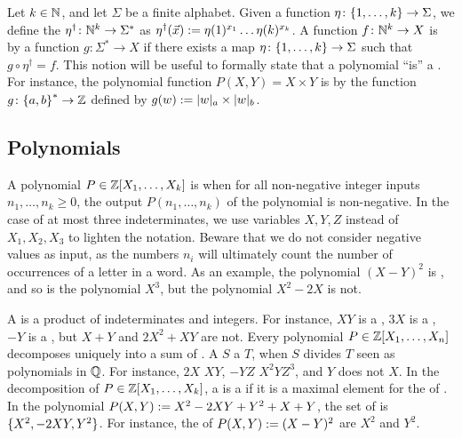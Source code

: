 \AP Let $k \in \mathbb{N}$, and let $\Sigma$ be a finite alphabet. Given a function
$\eta \colon \mathopen{\{} 1, \dots, k \mathclose{\}} \to \Sigma$, we define the $\eta^\dagger \colon
\mathbb{N}^k \to \Sigma^*$ as $\eta^\dagger(\vec{x}) \mathrel{:=} \eta(1)^{x_1} \dots
\eta(k)^{x_k}$. A function $f \colon \mathbb{N}^k \to X$ is  by a
 function $g \colon \Sigma^* \to X$ if there exists a map $\eta
\colon \mathopen{\{} 1, \dots, k \mathclose{\}} \to \Sigma$ such that $g \circ \eta^\dagger = f$. This
notion will be useful to formally state that a polynomial ``is'' a
 . For instance, the polynomial
function $P(X,Y) = X \times Y$ is  by the 
function $g \colon \mathopen{\{} a,b \mathclose{\}}^* \to \mathbb{Z}$ defined by $g(w) \defined \card[a]{w}
\times \card[b]{w}$.

\subsection{Polynomials} \AP A polynomial $P \in \mathbb{Z}[X_1, \dots, X_k]$ is
 when for all non-negative integer inputs $n_1, \dots, n_k
\geq 0$, the output  $P(n_1, \dots, n_k)$ of the polynomial is non-negative. In
the case of at most three indeterminates, we use variables $X,Y,Z$ instead of
$X_1, X_2, X_3$ to lighten the notation. Beware that we do not consider
negative values as input, as the numbers $n_i$ will ultimately count the number
of occurrences of a letter in a word. As an example, the polynomial $(X - Y)^2$
is , and so is the polynomial $X^3$, but the polynomial $X^2 -
2X$ is not.

\AP A  is a product of indeterminates and integers. For
instance, $XY$ is a , $3 X$ is a , $-Y$ is a
, but $X + Y$ and $2X^2 + XY$ are not. Every polynomial $P \in
\mathbb{Z}[X_1, \dots, X_n]$ decomposes uniquely into a sum of . A
 $S$  a  $T$, when $S$ divides $T$
seen as polynomials in $\mathbb{Q}$. For instance, $2X$  $XY$, $-YZ$
 $X^2 Y Z^3$, and $Y$ does not  $X$. In the
decomposition of $P \in \mathbb{Z}[X_1, \dots, X_k]$, a  is a
 if it is a maximal element for the  of . In the polynomial $P(X,Y) \mathrel{:=} X^2 - 2XY +
Y^2 + X + Y$, the set of  is $\mathopen{\{} X^2,  -2 XY,
Y^2 \mathclose{\}}$. For instance, the   of $P(X,Y) \mathrel{:=}
(X - Y)^2$ are $X^2$ and $Y^2$.

